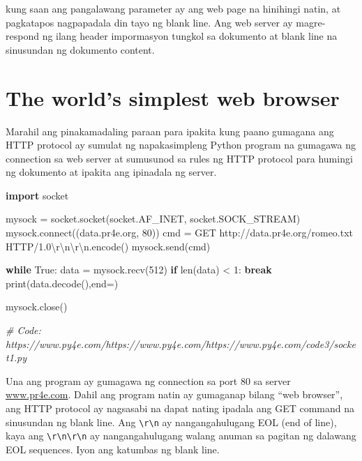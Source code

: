 \documentclass[10pt,]{book}
\newenvironment{Shaded}{}{}
\newcommand{\BuiltInTok}[1]{\textcolor[rgb]{0.00,0.50,0.00}{#1}}
\newcommand{\CharTok}[1]{\textcolor[rgb]{0.25,0.44,0.63}{#1}}
\newcommand{\CommentTok}[1]{\textcolor[rgb]{0.38,0.63,0.69}{\textit{#1}}}
\newcommand{\ControlFlowTok}[1]{\textcolor[rgb]{0.00,0.44,0.13}{\textbf{#1}}}
\newcommand{\DecValTok}[1]{\textcolor[rgb]{0.25,0.63,0.44}{#1}}
\newcommand{\ExtensionTok}[1]{#1}
\newcommand{\ImportTok}[1]{\textcolor[rgb]{0.00,0.50,0.00}{\textbf{#1}}}
\newcommand{\NormalTok}[1]{#1}
\newcommand{\OperatorTok}[1]{\textcolor[rgb]{0.40,0.40,0.40}{#1}}
\newcommand{\StringTok}[1]{\textcolor[rgb]{0.25,0.44,0.63}{#1}}
\newcommand{\VariableTok}[1]{\textcolor[rgb]{0.10,0.09,0.49}{#1}}
\begin{document}
kung saan ang pangalawang parameter ay ang web page na hinihingi natin,
at pagkatapos nagpapadala din tayo ng blank line. Ang web server ay
magre-respond ng ilang header impormasyon tungkol sa dokumento at blank
line na sinusundan ng dokumento content.

\section{The world's simplest web
browser}\label{the-worlds-simplest-web-browser}

Marahil ang pinakamadaling paraan para ipakita kung paano gumagana ang
HTTP protocol ay sumulat ng napakasimpleng Python program na gumagawa ng
connection sa web server at sumusunod sa rules ng HTTP protocol para
humingi ng dokumento at ipakita ang ipinadala ng server.

\begin{Shaded}
\begin{Highlighting}[]
\ImportTok{import}\NormalTok{ socket}

\NormalTok{mysock }\OperatorTok{=}\NormalTok{ socket.socket(socket.AF\_INET, socket.SOCK\_STREAM)}
\NormalTok{mysock.}\ExtensionTok{connect}\NormalTok{((}\StringTok{\textquotesingle{}data.pr4e.org\textquotesingle{}}\NormalTok{, }\DecValTok{80}\NormalTok{))}
\NormalTok{cmd }\OperatorTok{=} \StringTok{\textquotesingle{}GET http://data.pr4e.org/romeo.txt HTTP/1.0}\CharTok{\textbackslash{}r\textbackslash{}n\textbackslash{}r\textbackslash{}n}\StringTok{\textquotesingle{}}\NormalTok{.encode()}
\NormalTok{mysock.send(cmd)}

\ControlFlowTok{while} \VariableTok{True}\NormalTok{:}
\NormalTok{    data }\OperatorTok{=}\NormalTok{ mysock.recv(}\DecValTok{512}\NormalTok{)}
    \ControlFlowTok{if} \BuiltInTok{len}\NormalTok{(data) }\OperatorTok{\textless{}} \DecValTok{1}\NormalTok{:}
        \ControlFlowTok{break}
    \BuiltInTok{print}\NormalTok{(data.decode(),end}\OperatorTok{=}\StringTok{\textquotesingle{}\textquotesingle{}}\NormalTok{)}

\NormalTok{mysock.close()}

\CommentTok{\# Code: https://www.py4e.com/https://www.py4e.com/https://www.py4e.com/code3/socket1.py}
\end{Highlighting}
\end{Shaded}

Una ang program ay gumagawa ng connection sa port 80 sa server
\href{http://www.pr4e.com}{www.pr4e.com}. Dahil ang program natin ay
gumaganap bilang ``web browser'', ang HTTP protocol ay nagsasabi na
dapat nating ipadala ang GET command na sinusundan ng blank line. Ang
\texttt{\textbackslash{}r\textbackslash{}n} ay nangangahulugang EOL (end
of line), kaya ang
\texttt{\textbackslash{}r\textbackslash{}n\textbackslash{}r\textbackslash{}n}
ay nangangahulugang walang anuman sa pagitan ng dalawang EOL sequences.
Iyon ang katumbas ng blank line.
\end{document}
